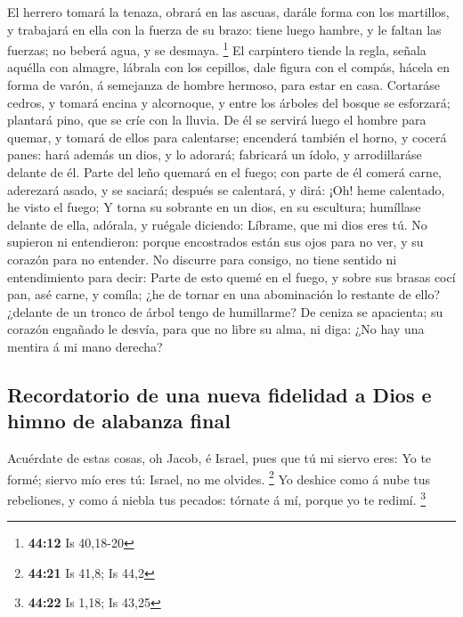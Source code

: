  El herrero tomará la tenaza, obrará en las ascuas,
darále forma con los martillos, y trabajará en ella con la fuerza de su
brazo: tiene luego hambre, y le faltan las fuerzas; no beberá agua, y se
desmaya. \footnote{\textbf{44:12} Is 40,18-20}  El
carpintero tiende la regla, señala aquélla con almagre, lábrala con los
cepillos, dale figura con el compás, hácela en forma de varón, á
semejanza de hombre hermoso, para estar en casa. 
Cortaráse cedros, y tomará encina y alcornoque, y entre los árboles del
bosque se esforzará; plantará pino, que se críe con la lluvia.
 De él se servirá luego el hombre para quemar, y tomará
de ellos para calentarse; encenderá también el horno, y cocerá panes:
hará además un dios, y lo adorará; fabricará un ídolo, y arrodillaráse
delante de él.  Parte del leño quemará en el fuego; con
parte de él comerá carne, aderezará asado, y se saciará; después se
calentará, y dirá: ¡Oh! heme calentado, he visto el fuego;
 Y torna su sobrante en un dios, en su escultura;
humíllase delante de ella, adórala, y ruégale diciendo: Líbrame, que mi
dios eres tú.  No supieron ni entendieron: porque
encostrados están sus ojos para no ver, y su corazón para no entender.
 No discurre para consigo, no tiene sentido ni
entendimiento para decir: Parte de esto quemé en el fuego, y sobre sus
brasas cocí pan, asé carne, y comíla; ¿he de tornar en una abominación
lo restante de ello? ¿delante de un tronco de árbol tengo de humillarme?
 De ceniza se apacienta; su corazón engañado le desvía,
para que no libre su alma, ni diga: ¿No hay una mentira á mi mano
derecha?

\hypertarget{recordatorio-de-una-nueva-fidelidad-a-dios-e-himno-de-alabanza-final}{%
\subsection{Recordatorio de una nueva fidelidad a Dios e himno de
alabanza
final}\label{recordatorio-de-una-nueva-fidelidad-a-dios-e-himno-de-alabanza-final}}

 Acuérdate de estas cosas, oh Jacob, é Israel, pues que
tú mi siervo eres: Yo te formé; siervo mío eres tú: Israel, no me
olvides. \footnote{\textbf{44:21} Is 41,8; Is 44,2}  Yo
deshice como á nube tus rebeliones, y como á niebla tus pecados: tórnate
á mí, porque yo te redimí. \footnote{\textbf{44:22} Is 1,18; Is 43,25}

